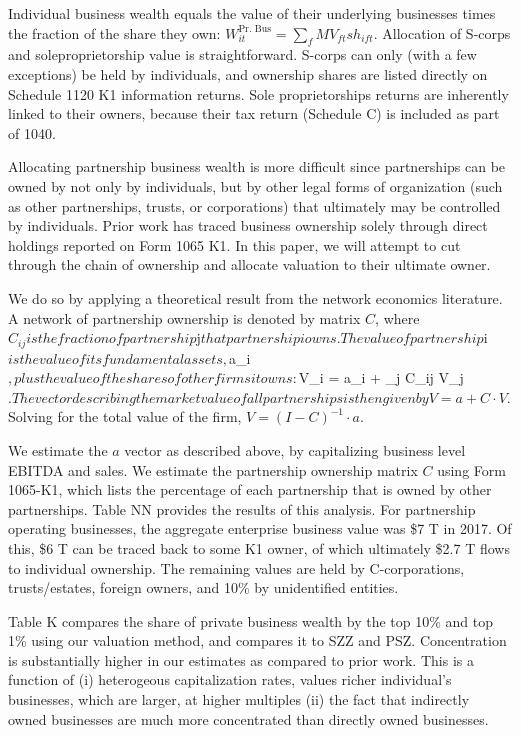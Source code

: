 \documentclass[12pt]{article}
\begin{document}
Individual business wealth equals the value of their underlying businesses times the fraction of the share they own: $W^{\text{Pr. Bus}}_{it} = \sum_f MV_{ft} sh_{ift}$. Allocation of S-corps and soleproprietorship value is straightforward. S-corps can only (with a few exceptions) be held by individuals, and ownership shares are listed directly on Schedule 1120 K1 information returns. Sole proprietorships returns are inherently linked to their owners, because their tax return (Schedule C) is included as part of 1040. 

Allocating partnership business wealth is more difficult since partnerships can be owned by not only by individuals, but by other legal forms of organization (such as other partnerships, trusts, or corporations) that ultimately may be controlled by individuals. Prior work has traced business ownership solely through direct holdings reported on Form 1065 K1. In this paper, we will attempt to cut through the chain of ownership and allocate valuation to their ultimate owner. 

We do so by applying a theoretical result from the network economics literature. A network of partnership ownership is denoted by matrix $C$, where $C_{ij} is the fraction of partnership $j$ that partnership i$$ owns. The value of partnership $i$ is the value of its fundamental assets, $a_i$, plus the value of the shares of other firms it owns: $V_i = a_i + \sum_j C_{ij} V_j$. The vector describing the market value of all partnerships is then given by V = a + C \cdot V$. Solving for the total value of the firm, $V = (I − C)^{-1} \cdot a$. 

We estimate the $a$ vector as described above, by capitalizing business level EBITDA and sales. We estimate the partnership ownership matrix $C$ using Form 1065-K1, which lists the percentage of each partnership that is owned by other partnerships. Table NN provides the results of this analysis. For partnership operating businesses, the aggregate enterprise business value was \$7 T in 2017. Of this, \$6 T can be traced back to some K1 owner, of which
ultimately \$2.7 T flows to individual ownership. The remaining values are held by C-corporations, trusts/estates, foreign owners, and 10\% by unidentified entities. 

Table K compares the share of private business wealth by the top 10\% and top 1\% using our valuation method, and compares it to SZZ and PSZ. Concentration is substantially higher in our estimates as compared to prior work. This is a function of (i) heterogeous capitalization rates, values richer individual's businesses, which are larger, at higher multiples (ii) the fact that indirectly owned businesses are much more concentrated than directly owned businesses. 
\end{document}
